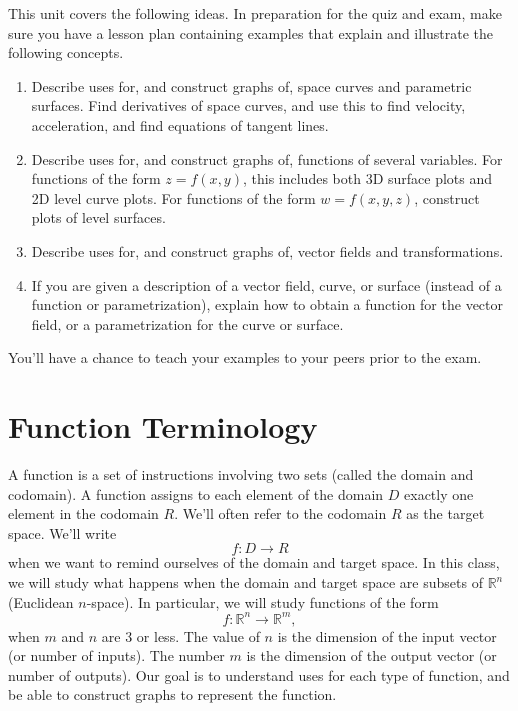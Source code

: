 
\noindent 
This unit covers the following ideas. In preparation for the quiz and exam, make sure you have a lesson plan containing examples that explain and illustrate the following concepts.  
\begin{enumerate}
\item Describe uses for, and construct graphs of, space curves and parametric surfaces. Find derivatives of space curves, and use this to find velocity, acceleration, and find equations of tangent lines.
\item Describe uses for, and construct graphs of, functions of several variables. For functions of the form $z=f(x,y)$, this includes both 3D surface plots and 2D level curve plots.  For functions of the form $w=f(x,y,z)$, construct plots of level surfaces.
\item Describe uses for, and construct graphs of, vector fields and transformations.
\item If you are given a description of a vector field, curve, or surface (instead of a function or parametrization), explain how to obtain a function for the vector field, or a parametrization for the curve or surface.
\end{enumerate}
You'll have a chance to teach your examples to your peers prior to the exam.



\section{Function Terminology}
A function is a set of instructions involving two sets (called the domain and codomain).  A function assigns to each element of the domain $D$ exactly one element in the codomain $R$. We'll often refer to the codomain $R$ as the target space.  We'll write $$f\colon D\to R$$ when we want to remind ourselves of the domain and target space.  In this class, we will study what happens when the domain and target space are subsets of ${\mathbb{R}}^n$ (Euclidean $n$-space).  In particular, we will study functions of the form $$f\colon {\mathbb{R}}^n\to {\mathbb{R}}^m,$$ when $m$ and $n$ are 3 or less. The value of $n$ is the dimension of the input vector (or number of inputs).  The number $m$ is the dimension of the output vector (or number of outputs).  Our goal is to understand uses for each type of function, and be able to construct graphs to represent the function.

